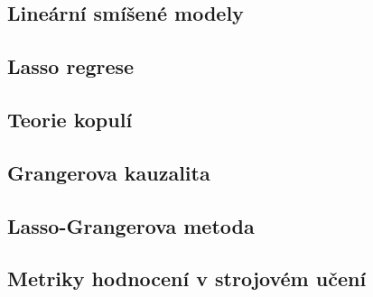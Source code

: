 \subsection{Lineární smíšené modely}
\label{subsec:lm_modely}

\subsection{Lasso regrese}
\label{subsec:lasso}

\subsection{Teorie kopulí}
\label{subsec:teorie_kopul}

\subsection{Grangerova kauzalita}
\label{subsec:granger}

\subsection{Lasso-Grangerova metoda}
\label{subsec:lasso_granger}

\subsection{Metriky hodnocení v strojovém učení}
\label{subsec:ml_metriky}

